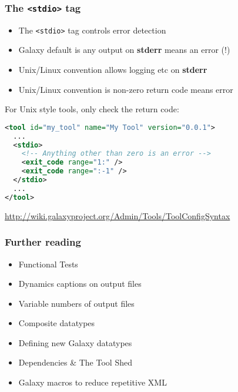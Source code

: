 \documentclass[table]{beamer}
\begin{document}
\begin{frame}[fragile]
\frametitle{The \texttt{<stdio>} tag}
\begin{itemize}
\item The \texttt{<stdio>} tag controls error detection
\item Galaxy default is any output on \textbf{stderr} means an error (!)
\item Unix/Linux convention allows logging etc on \textbf{stderr}
\item Unix/Linux convention is non-zero return code means error
\end{itemize}
For Unix style tools, only check the return code:
\vspace{3mm}
{\scriptsize
\begin{lstlisting}[language=xml]
<tool id="my_tool" name="My Tool" version="0.0.1">
  ...
  <stdio>
    <!-- Anything other than zero is an error -->
    <exit_code range="1:" />
    <exit_code range=":-1" />
  </stdio>
  ...
</tool>
\end{lstlisting}
} %
\vspace{-5mm}
{\scriptsize \url{http://wiki.galaxyproject.org/Admin/Tools/ToolConfigSyntax}}
\end{frame}

\begin{frame}
\frametitle{Further reading}
\begin{itemize}
\item Functional Tests
\item Dynamics captions on output files
\item Variable numbers of output files
\item Composite datatypes
\item Defining new Galaxy datatypes
\item Dependencies \& The Tool Shed
\item Galaxy macros to reduce repetitive XML
\end{itemize}
\end{frame}
\end{document}
